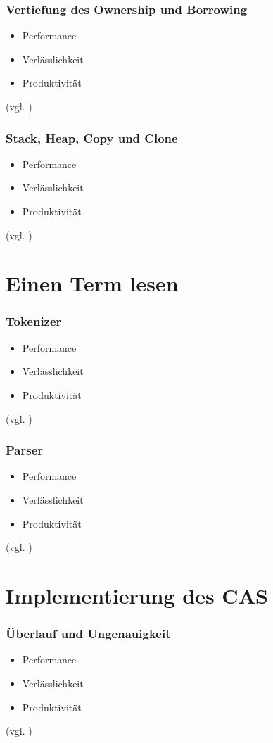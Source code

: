 \documentclass{beamer}
\begin{document}
\begin{frame}[fragile]
  \frametitle{Vertiefung des Ownership und Borrowing}
  \begin{itemize}
    \item Performance
    \pause
    \item Verlässlichkeit
    \pause
    \item Produktivität
  \end{itemize}
  {\small (vgl. \cite{WhyRust})}
\end{frame}

\begin{frame}[fragile]
  \frametitle{Stack, Heap, Copy und Clone}
  \begin{itemize}
    \item Performance
    \pause
    \item Verlässlichkeit
    \pause
    \item Produktivität
  \end{itemize}
  {\small (vgl. \cite{WhyRust})}
\end{frame}

\section{Einen Term lesen}
\begin{frame}[fragile]
  \frametitle{Tokenizer}
  \begin{itemize}
    \item Performance
    \pause
    \item Verlässlichkeit
    \pause
    \item Produktivität
  \end{itemize}
  {\small (vgl. \cite{WhyRust})}
\end{frame}

\begin{frame}[fragile]
  \frametitle{Parser}
  \begin{itemize}
    \item Performance
    \pause
    \item Verlässlichkeit
    \pause
    \item Produktivität
  \end{itemize}
  {\small (vgl. \cite{WhyRust})}
\end{frame}

\section{Implementierung des CAS}
\begin{frame}[fragile]
  \frametitle{Überlauf und Ungenauigkeit}
  \begin{itemize}
    \item Performance
    \pause
    \item Verlässlichkeit
    \pause
    \item Produktivität
  \end{itemize}
  {\small (vgl. \cite{WhyRust})}
\end{frame}
\end{document}
